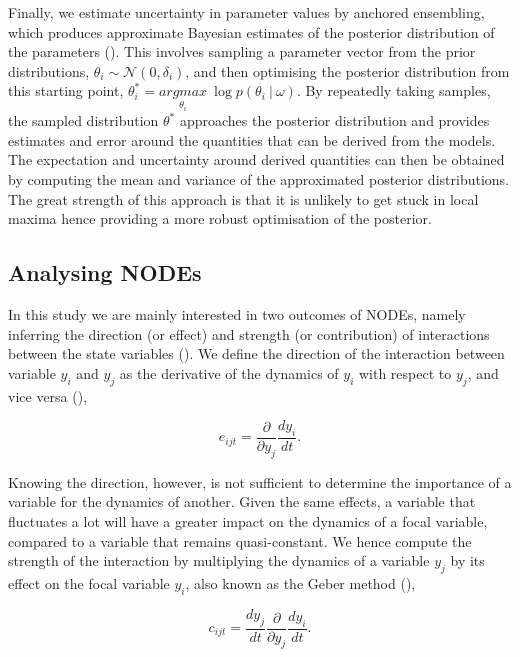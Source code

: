 \documentclass[11pt, oneside]{article}
\begin{document}
Finally, we estimate uncertainty in parameter values by anchored ensembling, which produces approximate Bayesian estimates of the posterior distribution of the parameters (\cite{Pearce2018}).
This involves sampling a parameter vector from the prior distributions, $\theta_{i} \sim \mathcal{N}(0,\delta_{i})$, and then optimising the posterior distribution from this starting point, $\theta^*_i = \underset{\theta_i}{argmax}~\log p(\theta_i~|~\omega)$.
By repeatedly taking samples, the sampled distribution $\theta^*$ approaches the posterior distribution and provides estimates and error around the quantities that can be derived from the models.
The expectation and uncertainty around derived quantities can then be obtained by computing the mean and variance of the approximated posterior distributions.
The great strength of this approach is that it is unlikely to get stuck in local maxima hence providing a more robust optimisation of the posterior.

\subsection{Analysing NODEs}

In this study we are mainly interested in two outcomes of NODEs, namely inferring the direction (or effect) and strength (or contribution) of interactions between the state variables (\cite{Bonnaffe2021a}).
We define the direction of the interaction between variable $y_i$ and $y_j$ as the derivative of the dynamics of $y_i$ with respect to $y_j$, and vice versa (\cite{Sugihara2012}), 

\vspace{-0.5cm}
\begin{equation}
    e_{ijt} = \frac{\partial}{\partial y_j} \frac{dy_i}{dt}.
\end{equation}

Knowing the direction, however, is not sufficient to determine the importance of a variable for the dynamics of another. 
Given the same effects, a variable that fluctuates a lot will have a greater impact on the dynamics of a focal variable, compared to a variable that remains quasi-constant.
We hence compute the strength of the interaction by multiplying the dynamics of a variable $y_j$ by its effect on the focal variable $y_i$, also known as the Geber method (\cite{Hairston2005}),

\vspace{-0.5cm}
\begin{equation}
    c_{ijt} = \frac{dy_j}{dt} \frac{\partial}{\partial y_j} \frac{dy_i}{dt}.
\end{equation}
\end{document}
